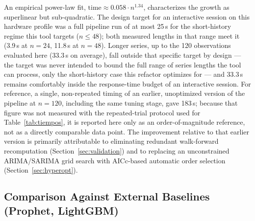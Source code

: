 \documentclass[forecasting,article,submit,pdftex,moreauthors]{Definitions/mdpi}
\begin{document}
An empirical power-law fit, $\text{time} \approx 0.058 \cdot n^{1.34}$, characterizes the growth as superlinear but sub-quadratic. The design target for an interactive session on this hardware profile was a full pipeline run of at most 25\,s for the short-history regime this tool targets ($n\leq48$); both measured lengths in that range meet it (3.9\,s at $n=24$, 11.8\,s at $n=48$). Longer series, up to the 120 observations evaluated here (33.3\,s on average), fall outside that specific target by design --- the target was never intended to bound the full range of series lengths the tool can process, only the short-history case this refactor optimizes for --- and 33.3\,s remains comfortably inside the response-time budget of an interactive session. For reference, a single, non-repeated timing of an earlier, unoptimized version of the pipeline at $n=120$, including the same tuning stage, gave 183\,s; because that figure was not measured with the repeated-trial protocol used for Table~\ref{tab:tiempos}, it is reported here only as an order-of-magnitude reference, not as a directly comparable data point. The improvement relative to that earlier version is primarily attributable to eliminating redundant walk-forward recomputation (Section~\ref{sec:validation}) and to replacing an unconstrained ARIMA/SARIMA grid search with AICc-based automatic order selection (Section~\ref{sec:hyperopt}).

\subsection{Comparison Against External Baselines (Prophet, LightGBM)}
\label{sec:autobaselines}
\end{document}
